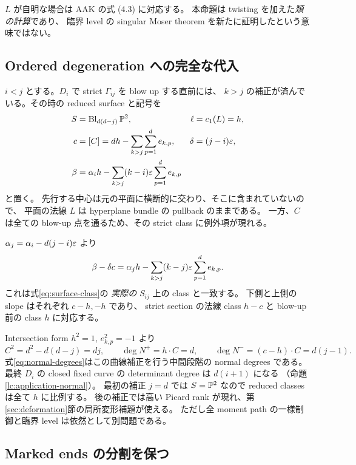 $L$ が自明な場合は AAK の式 (4.3) に対応する\cite[Section 4]{aak}。
本命題は twisting を加えた\emph{類の計算}であり、
臨界 level の singular Moser theorem を新たに証明したという意味ではない。

\subsection{Ordered degeneration への完全な代入}

$i<j$ とする。$D_i$ で strict $\Gamma_{ij}$ を blow up する直前には、
$k>j$ の補正が済んでいる。その時の reduced surface と記号を
\begin{align}
S&=\operatorname{Bl}_{d(d-j)}\mathbb P^2,&
\ell&=c_1(L)=h,\nonumber\\
c&=[C]=dh-\sum_{k>j}\sum_{p=1}^d e_{k,p},&
\delta&=(j-i)\varepsilon,\label{eq:dh-input}\\
\beta&=\alpha_i h-\sum_{k>j}(k-i)\varepsilon\sum_{p=1}^d e_{k,p}
\nonumber
\end{align}
と置く。
先行する中心は元の平面に横断的に交わり、そこに含まれていないので、
平面の法線 $L$ は hyperplane bundle の pullback のままである。
一方、$C$ は全ての blow-up 点を通るため、その strict class に例外項が現れる。

$\alpha_j=\alpha_i-d(j-i)\varepsilon$ より
\begin{equation}\label{eq:dh-match}
\beta-\delta c
=\alpha_j h-\sum_{k>j}(k-j)\varepsilon\sum_{p=1}^d e_{k,p}.
\end{equation}
これは式\eqref{eq:surface-class}の \emph{実際の} $S_{ij}$ 上の class と一致する。
下側と上側の slope はそれぞれ $c-h,-h$ であり、
strict section の法線 class $h-c$ と blow-up 前の class $h$ に対応する。

Intersection form $h^2=1$, $e_{k,p}^2=-1$ より
\begin{equation}\label{eq:normal-degrees}
C^2=d^2-d(d-j)=dj,\qquad
\deg N^+=h\cdot C=d,\qquad
\deg N^-=(c-h)\cdot C=d(j-1).
\end{equation}
式\eqref{eq:normal-degrees}はこの曲線補正を行う中間段階の normal degrees である。
最終 $D_i$ の closed fixed curve の determinant degree は $d(i+1)$ になる
（命題\ref{lc:application-normal}）。
最初の補正 $j=d$ では $S=\mathbb P^2$ なので reduced classes は全て $h$ に比例する。
後の補正では高い Picard rank が現れ、第\ref{sec:deformation}節の局所変形補題が使える。
ただし全 moment path の一様制御と臨界 level は依然として別問題である。

\subsection{Marked ends の分割を保つ}\label{subsec:markings}


